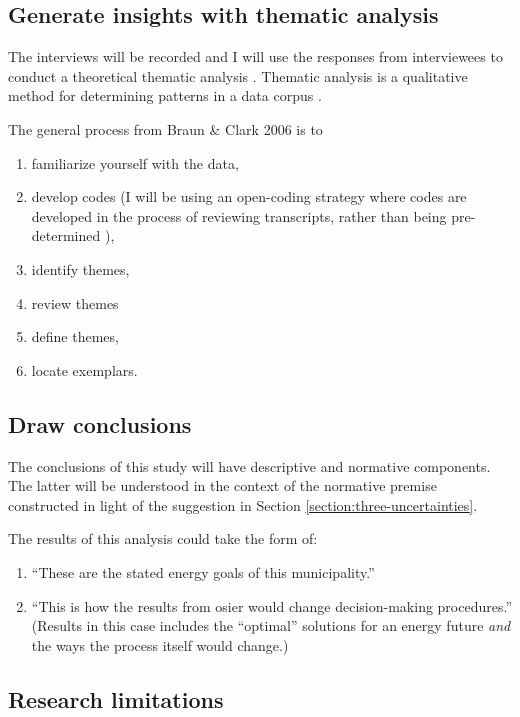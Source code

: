 \subsection{Generate insights with thematic analysis}

The interviews will be recorded and I will use the responses from interviewees
to conduct a theoretical thematic analysis
\cite{braun_toward_2023,maguire_doing_2017,scharp_what_2019}. Thematic analysis
is a qualitative method for determining patterns in a data corpus
\cite{scharp_what_2019}. 

The general process from Braun \& Clark 2006 \cite{braun_using_2006} is to
\begin{enumerate}
    \item familiarize yourself with the data,
    \item develop codes (I will be using an open-coding strategy where codes are
    developed in the process of reviewing transcripts, rather than being
    pre-determined \cite{maguire_doing_2017}),
    \item identify themes,
    \item review themes
    \item define themes, 
    \item locate exemplars.
\end{enumerate}


\subsection{Draw conclusions}

The conclusions of this study will have descriptive and normative components.
The latter will be understood in the context of the normative premise
constructed in light of the suggestion in Section
\ref{section:three-uncertainties}.

The results of this analysis could take the form of:
    \begin{enumerate}
        \item ``These are the stated energy goals of this municipality.''
        \item ``This is how the results from \ac{osier} would change
        decision-making procedures.'' (Results in this case includes the
        ``optimal'' solutions for an energy future \textit{and} the ways the
        process itself would change.)
    \end{enumerate}

\subsection{Research limitations}

